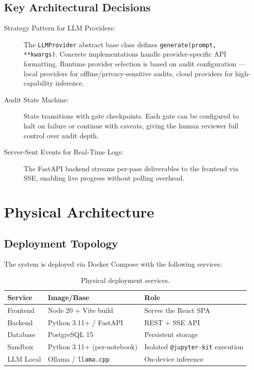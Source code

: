 \documentclass[11pt, a4paper]{article}
\begin{document}
\subsection*{Key Architectural Decisions}

\begin{description}
  \item[Strategy Pattern for LLM Providers:] The \texttt{LLMProvider}
    abstract base class defines \texttt{generate(prompt, **kwargs)}. Concrete
    implementations handle provider-specific API formatting. Runtime provider
    selection is based on audit configuration — local providers for
    offline/privacy-sensitive audits, cloud providers for high-capability
    inference.

  \item[Audit State Machine:] State transitions with gate checkpoints. Each
    gate can be configured to halt on failure or continue with caveats,
    giving the human reviewer full control over audit depth.

  \item[Server-Sent Events for Real-Time Logs:] The FastAPI backend streams
    per-pass deliverables to the frontend via SSE, enabling live progress
    without polling overhead.
\end{description}

\section{Physical Architecture}
\label{sec:physical-arch}

\subsection*{Deployment Topology}

The system is deployed via Docker Compose with the following services:

\begin{table}[H]
  \centering
  \caption{Physical deployment services.}
  \label{tab:deployment}
  \renewcommand{\arraystretch}{1.3}
  \begin{tabularx}{\textwidth}{l l Y}
    \toprule
    \textbf{Service} & \textbf{Image/Base} & \textbf{Role} \\
    \midrule
    Frontend & Node 20 + Vite build & Serves the React SPA \\
    Backend & Python 3.11+ / FastAPI & REST + SSE API \\
    Database & PostgreSQL 15 & Persistent storage \\
    Sandbox & Python 3.11+ (per-notebook) & Isolated \texttt{@jupyter-kit}
      execution \\
    LLM Local & Ollama / \texttt{llama.cpp} & On-device inference \\
    \bottomrule
  \end{tabularx}
\end{table}
\end{document}
